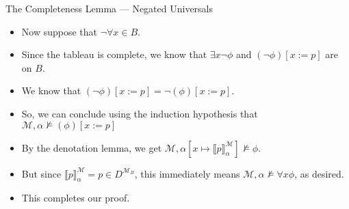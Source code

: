 \documentclass[../slides.tex]{subfiles}
\begin{document}
\begin{frame}{The Completeness Lemma --- Negated Universals}

  \begin{itemize}

  \item Now suppose that $\neg\forall x\in B$.

    \item Since the tableau is complete, we know that $\exists
      x\neg\phi$ and $(\neg \phi)[x:=p]$ are on $B$.

    \item We know that $(\neg \phi)[x:=p]=\neg (\phi)[x:=p]$.

      \item So, we can conclude using the induction hypothesis that $\mathcal{M}, \alpha\nvDash
        (\phi)[x:=p]$

        \item By the denotation lemma, we get
          $\mathcal{M},\alpha[x\mapsto \llbracket
          p\rrbracket^\mathcal{M}_\alpha]\nvDash \phi$.

          \item But since $\llbracket
            p\rrbracket^\mathcal{M}_\alpha=p\in D^{\mathcal{M}_B}$,
            this immediately means $\mathcal{M},\alpha\nvDash \forall
            x\phi$, as desired.

            \item This completes our proof. 
    
  \end{itemize}
  
\end{frame}
\end{document}
